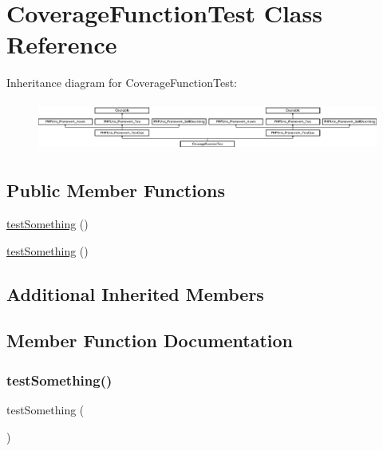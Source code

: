 \hypertarget{class_coverage_function_test}{}\section{Coverage\+Function\+Test Class Reference}
\label{class_coverage_function_test}
Inheritance diagram for Coverage\+Function\+Test\+:\begin{figure}[H]
\begin{center}
\leavevmode
\includegraphics[height=1.651917cm]{class_coverage_function_test}
\end{center}
\end{figure}
\subsection*{Public Member Functions}
\begin{DoxyCompactItemize}
\item 
\mbox{\hyperlink{class_coverage_function_test_a0fc4e17369bc9607ebdd850d9eda8167}{test\+Something}} ()
\item 
\mbox{\hyperlink{class_coverage_function_test_a0fc4e17369bc9607ebdd850d9eda8167}{test\+Something}} ()
\end{DoxyCompactItemize}
\subsection*{Additional Inherited Members}


\subsection{Member Function Documentation}
\mbox{\label{class_coverage_function_test_a0fc4e17369bc9607ebdd850d9eda8167}} 
\subsubsection{\texorpdfstring{test\+Something()}{testSomething()}\hspace{0.1cm}{\footnotesize\ttfamily [1/2]}}
{\footnotesize\ttfamily test\+Something (\begin{DoxyParamCaption}{ }\end{DoxyParamCaption})}

